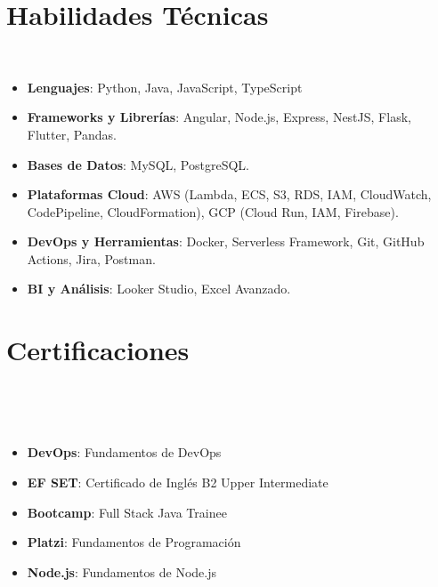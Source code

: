 \documentclass[letterpaper,11pt]{article}
\newcommand{\resumeItem}[2]{
  \item\small{
    \textbf{#1}{#2 \vspace{-2pt}}
  }
}
\newcommand{\resumeSubItem}[2]{\resumeItem{#1}{#2}\vspace{-4pt}}
\newcommand{\resumeSubItemcol}[2]{\resumeItem{#1}{#2}\vspace{-8pt}}
\newcommand{\resumeSubHeadingListStart}{\begin{itemize}[leftmargin=*]}
\newcommand{\resumeSubHeadingListEnd}{\end{itemize}}
\begin{document}
\section{Habilidades Técnicas}
 \resumeSubHeadingListStart
 \resumeSubItem{}{\textbf{Lenguajes}{: Python, Java, JavaScript, TypeScript}}
 \resumeSubItem{}{\textbf{Frameworks y Librerías}{: Angular, Node.js, Express, NestJS, Flask, Flutter, Pandas.}}
 \resumeSubItem{}{\textbf{Bases de Datos}{: MySQL, PostgreSQL.}}
 \resumeSubItem{}{\textbf{Plataformas Cloud}{: AWS (Lambda, ECS, S3, RDS, IAM, CloudWatch, CodePipeline, CloudFormation), GCP (Cloud Run, IAM, Firebase).}}
 \resumeSubItem{}{\textbf{DevOps y Herramientas}{: Docker, Serverless Framework, Git, GitHub Actions, Jira, Postman.}}
 \resumeSubItem{}{\textbf{BI y Análisis}{: Looker Studio, Excel Avanzado.}}
 \resumeSubHeadingListEnd

\section{Certificaciones}
\vspace{-15pt}
  \begin{multicols}{2}
    \resumeSubHeadingListStart
    \resumeSubItemcol{DevOps}{: Fundamentos de DevOps}
    \resumeSubItemcol{EF SET}{: Certificado de Inglés B2 Upper Intermediate}
    \resumeSubItemcol{Bootcamp}{: Full Stack Java Trainee}
    \resumeSubItemcol{Platzi}{: Fundamentos de Programación}
    \resumeSubItemcol{Node.js}{: Fundamentos de Node.js}
  \resumeSubHeadingListEnd
  \end{multicols}
\end{document}

